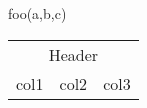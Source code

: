\documentclass{article}
\newenvironment{funcdef}[1]{\begingroup #1}{\endgroup}
\begin{document}
\begin{funcdef}{foo(a,b,c)}
\end{funcdef}
\begin{tabular}{lll}
\multicolumn{3}{c}{Header}\\
col1&col2&col3
\end{tabular}
\end{document}
